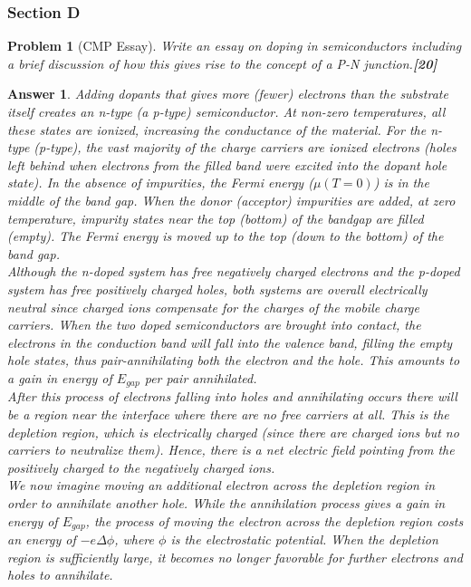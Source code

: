 \documentclass[a4paper]{article}
\newtheorem{ans}{Answer}[subsection]
\theoremstyle{new}
\newtheorem{qns}{Problem}[subsection]
\begin{document}
\subsubsection{Section D}
\begin{qns}[CMP Essay]
Write an essay on doping in semiconductors including a brief discussion of how this gives rise to the concept of a P-N junction.\hfill\textbf{[20]}
\end{qns}
\begin{ans}
Adding dopants that gives more (fewer) electrons than the substrate itself creates an n-type (a p-type) semiconductor. At non-zero temperatures, all these states are ionized, increasing the conductance of the material. For the n-type (p-type), the vast majority of the charge carriers are ionized electrons (holes left behind when electrons from the filled band were excited into the dopant hole state). In the absence of impurities, the Fermi energy ($\mu(T=0)$) is in the middle of the band gap. When the donor (acceptor) impurities are added, at zero temperature, impurity states near the top (bottom) of the bandgap are filled (empty). The Fermi energy is moved up to the top (down to the bottom) of the band gap.\\[5pt]
Although the n-doped system has free negatively charged electrons and the p-doped system has free positively charged holes, both systems are overall electrically neutral since charged ions compensate for the charges of the mobile charge carriers. When the two doped semiconductors are brought into contact, the electrons in the conduction band will fall into the valence band, filling the empty hole states, thus pair-annihilating both the electron and the hole. This amounts to a gain in energy of $E_{gap}$ per pair annihilated.\\[5pt]
After this process of electrons falling into holes and annihilating occurs there will be a region near the interface where there are no free carriers at all. This is the depletion region, which is electrically charged (since there are charged ions but no carriers to neutralize them). Hence, there is a net electric field pointing from the positively charged to the negatively charged ions.\\[5pt]
We now imagine moving an additional electron across the depletion region in order to annihilate another hole. While the annihilation process gives a gain in energy of $E_{gap}$, the process of moving the electron across the depletion region costs an energy of $-e\Delta\phi$, where $\phi$ is the electrostatic potential. When the depletion region is sufficiently large, it becomes no longer favorable for further electrons and holes to annihilate. \\[5pt]

\end{ans}
\end{document}
